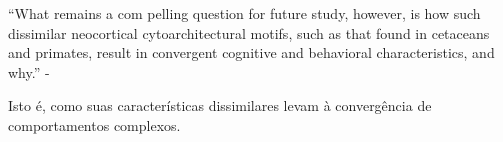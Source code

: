 \documentclass[
    12pt,
    openright,
    twoside,
    a4paper,
    english,
    french,
    spanish,
    brazil
    ]{abntex2}
\begin{document}
\begin{displayquote}
``What remains a com pelling question for future study, however, is how such
    dissimilar neocortical cytoarchitectural motifs, such as that found in
    cetaceans and primates, result in convergent cognitive and behavioral
    characteristics, and why.'' - 
\end{displayquote}

Isto é, como suas características dissimilares levam à convergência de
comportamentos complexos.

\postextual



\printindex
\end{document}

